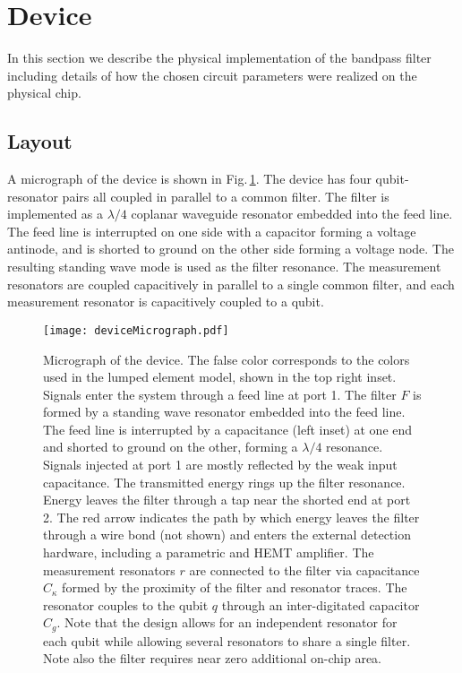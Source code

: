 \section{Device}

In this section we describe the physical implementation of the bandpass filter including details of how the chosen circuit parameters were realized on the physical chip.

\subsection{Layout}

A micrograph of the device is shown in Fig.\,\ref{Fig:deviceMicrograph}.
The device has four qubit-resonator pairs all coupled in parallel to a common filter.
The filter is implemented as a $\lambda/4$ coplanar waveguide resonator embedded into the feed line.
The feed line is interrupted on one side with a capacitor forming a voltage antinode, and is shorted to ground on the other side forming a voltage node.
The resulting standing wave mode is used as the filter resonance.
The measurement resonators are coupled capacitively in parallel to a single common filter, and each measurement resonator is capacitively coupled to a qubit.

\begin{figure}
\begin{centering}
\texttt{[image: deviceMicrograph.pdf]}
\par\end{centering}
\caption{Micrograph of the device. The false color corresponds to the colors used in the lumped element model, shown in the top right inset. Signals enter the system through a feed line at port 1. The filter $F$ is formed by a standing wave resonator embedded into the feed line. The feed line is interrupted by a capacitance (left inset) at one end and shorted to ground on the other, forming a $\lambda/4$ resonance. Signals injected at port 1 are mostly reflected by the weak input capacitance. The transmitted energy rings up the filter resonance. Energy leaves the filter through a tap near the shorted end at port 2. The red arrow indicates the path by which energy leaves the filter through a wire bond (not shown) and enters the external detection hardware, including a parametric and HEMT amplifier. The measurement resonators $r$ are connected to the filter via capacitance $C_{\kappa}$ formed by the proximity of the filter and resonator traces. The resonator couples to the qubit $q$ through an inter-digitated capacitor $C_g$. Note that the design allows for an independent resonator for each qubit while allowing several resonators to share a single filter. Note also the filter requires near zero additional on-chip area.}
\label{Fig:deviceMicrograph}
\end{figure}

